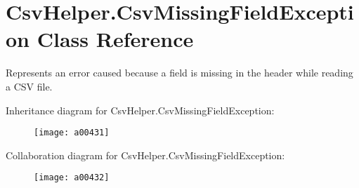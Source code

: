 \hypertarget{a00069}{\section{Csv\-Helper.\-Csv\-Missing\-Field\-Exception Class Reference}
\label{a00069}
}


Represents an error caused because a field is missing in the header while reading a C\-S\-V file.  




Inheritance diagram for Csv\-Helper.\-Csv\-Missing\-Field\-Exception\-:
\nopagebreak
\begin{figure}[H]
\begin{center}
\leavevmode
\texttt{[image: a00431]}
\end{center}
\end{figure}


Collaboration diagram for Csv\-Helper.\-Csv\-Missing\-Field\-Exception\-:
\nopagebreak
\begin{figure}[H]
\begin{center}
\leavevmode
\texttt{[image: a00432]}
\end{center}
\end{figure}
